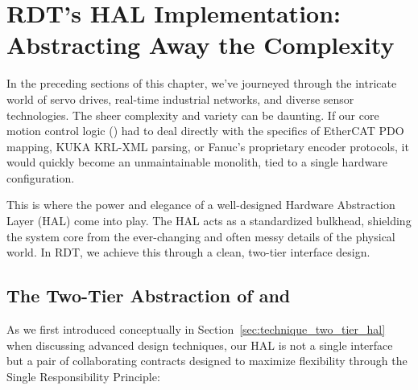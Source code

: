 

\section{RDT's HAL Implementation: Abstracting Away the Complexity}
\label{sec:rdt_hal_implementation}

In the preceding sections of this chapter, we've journeyed through the intricate world of servo drives, real-time industrial networks, and diverse sensor technologies. The sheer complexity and variety can be daunting. If our core motion control logic () had to deal directly with the specifics of EtherCAT PDO mapping, KUKA KRL-XML parsing, or Fanuc's proprietary encoder protocols, it would quickly become an unmaintainable monolith, tied to a single hardware configuration.

This is where the power and elegance of a well-designed Hardware Abstraction Layer (HAL) come into play. The HAL acts as a standardized bulkhead, shielding the system core from the ever-changing and often messy details of the physical world. In RDT, we achieve this through a clean, two-tier interface design.

\subsection{The Two-Tier Abstraction of  and }
\label{subsec:hal_recap_two_tier}

As we first introduced conceptually in Section~\ref{sec:technique_two_tier_hal} when discussing advanced design techniques, our HAL is not a single interface but a pair of collaborating contracts designed to maximize flexibility through the Single Responsibility Principle:

